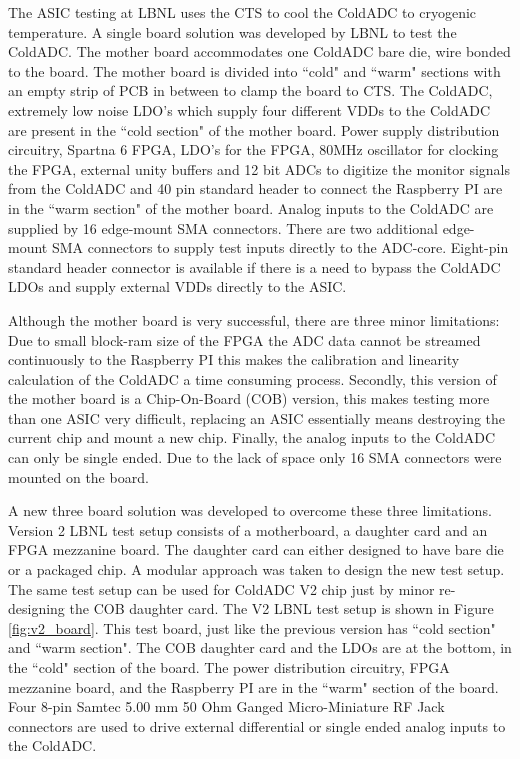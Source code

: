 \label{sec:2.4}

The ASIC testing at LBNL uses the CTS to cool the ColdADC to cryogenic temperature. 
A single board solution was developed by LBNL to test the ColdADC. The mother board accommodates one ColdADC bare die, wire bonded to the board. The mother board is divided into ``cold" and ``warm" sections with an empty strip of PCB in between to clamp the board to CTS. The ColdADC, extremely low noise LDO's which supply four different VDDs to the ColdADC are present in the ``cold section" of the mother board. Power supply distribution circuitry, Spartna 6 FPGA, LDO's for the FPGA, 80MHz oscillator for clocking the FPGA, external unity buffers and 12 bit ADCs to digitize the monitor signals from the ColdADC and 40 pin standard header to connect the Raspberry PI are in the ``warm section" of the mother board. Analog inputs to the ColdADC are supplied by 16 edge-mount SMA connectors. There are two additional edge-mount SMA connectors to supply test inputs directly to the ADC-core. Eight-pin standard header connector is available if there is a need to bypass the ColdADC LDOs and supply external VDDs directly to the ASIC.

Although the mother board is very successful, there are three minor limitations: Due to small block-ram size of the FPGA the ADC data cannot be streamed continuously to the Raspberry PI this makes the calibration and linearity calculation of the ColdADC a time consuming process. Secondly, this version of the mother board is a Chip-On-Board (COB) version, this makes testing more than one ASIC very difficult, replacing an ASIC essentially means destroying the current chip and mount a new chip. Finally, the analog inputs to the ColdADC can only be single ended. Due to the lack of space only 16 SMA connectors were mounted on the board.  

A new three board solution was developed to overcome these three limitations. Version 2 LBNL test setup consists of a motherboard, a daughter card and an FPGA mezzanine board. The daughter card can either designed to have bare die or a packaged chip. A modular approach was taken to design the new test setup. The same test setup can be used for ColdADC V2 chip just by minor re-designing the COB daughter card. The V2 LBNL test setup is shown in Figure \ref{fig:v2_board}. This test board, just like the previous version has ``cold section" and ``warm section". The COB daughter card and the LDOs are at the bottom, in the ``cold" section of the board. The power distribution circuitry, FPGA mezzanine board, and the Raspberry PI are in the ``warm" section of the board. Four 8-pin Samtec 5.00 mm 50 Ohm Ganged Micro-Miniature RF Jack connectors are used to drive external differential or single ended analog inputs to the ColdADC.  

